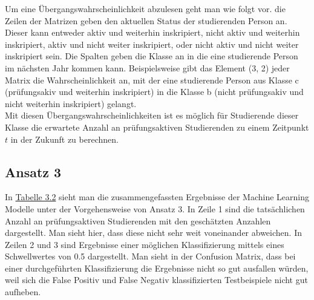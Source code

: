 Um eine \"Ubergangswahrscheinlichkeit abzulesen geht man wie folgt vor. die Zeilen der Matrizen geben den aktuellen Status der studierenden Person an. 
Dieser kann entweder \glqq aktiv und weiterhin inskripiert\grqq{}, \glqq nicht aktiv und weiterhin inskripiert\grqq{}, \glqq aktiv und nicht weiter inskripiert\grqq{}, oder \glqq nicht aktiv und nicht weiter inskripiert\grqq{} sein.
Die Spalten geben die Klasse an in die eine studierende Person im n\"achsten Jahr kommen kann. Beispielsweise gibt das Element (3, 2) jeder Matrix die Wahrscheinlichkeit an,
mit der eine studierende Person aus Klasse c (pr\"ufungsakiv und weiterhin inskripiert) in die Klasse b (nicht pr\"ufungsakiv und nicht weiterhin inskripiert) gelangt.\\


Mit diesen \"Ubergangswahrscheinlichkeiten ist es m\"oglich f\"ur Studierende dieser Klasse die erwartete Anzahl an pr\"ufungsaktiven Studierenden 
zu einem Zeitpunkt $t$ in der Zukunft zu berechnen.

\subsection{Ansatz 3}

In \hyperref[tab:ergebnisA3P1]{Tabelle 3.2} sieht man die zusammengefassten Ergebnisse der  Machine Learning Modelle unter der Vorgehensweise von Ansatz 3. 
In Zeile 1 sind die tats\"achlichen Anzahl an pr\"ufungsaktiven Studierenden mit den gesch\"atzten Anzahlen dargestellt. Man sieht hier, dass diese nicht sehr weit voneinander abweichen.
In Zeilen 2 und 3 sind Ergebnisse einer m\"oglichen Klassifizierung mittels eines Schwellwertes von 0.5 dargestellt. Man sieht in der Confusion Matrix, dass bei einer 
durchgef\"uhrten Klassifizierung die Ergebnisse nicht so gut ausfallen w\"urden, weil sich die False Positiv und False Negativ klassifizierten Testbeispiele nicht gut aufheben. 


